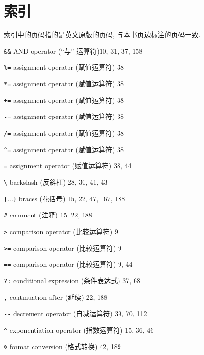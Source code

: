 \chapter{索引}
\label{chap:index}

索引中的页码指的是英文原版的页码, 与本书页边标注的页码一致.

\begin{multicols}{2}
\setlength\parindent{0pt}
\small
\hangindent=2pc  \verb'&&' AND operator (``与'' 运算符)10, 31, 37, 158

\hangindent=2pc  \verb'%=' assignment operator (赋值运算符) 38

\hangindent=2pc  \verb'*=' assignment operator (赋值运算符) 38

\hangindent=2pc  \verb'+=' assignment operator (赋值运算符) 38

\hangindent=2pc  \verb'-=' assignment operator (赋值运算符) 38

\hangindent=2pc  \verb'/=' assignment operator (赋值运算符) 38

\hangindent=2pc  \verb'^=' assignment operator (赋值运算符) 38

\hangindent=2pc  \verb'=' assignment operator (赋值运算符) 38, 44

\hangindent=2pc  \verb'\' backslash (反斜杠) 28, 30, 41, 43

\hangindent=2pc  \verb'{'...\verb'}' braces (花括号) 15, 22, 47, 167, 188

\hangindent=2pc  \verb'#' comment (注释) 15, 22, 188

\hangindent=2pc  \verb'>' comparison operator (比较运算符) 9

\hangindent=2pc  \verb'>=' comparison operator (比较运算符) 9

\hangindent=2pc  \verb'==' comparison operator (比较运算符) 9, 44

\hangindent=2pc  \verb'?:' conditional expression (条件表达式) 37, 68

\hangindent=2pc  \verb',' continuation after (延续) 22, 188

\hangindent=2pc  \verb'--' decrement operator (自减运算符) 39, 70, 112

\hangindent=2pc  \verb'^' exponentiation operator (指数运算符) 15, 36, 46

\hangindent=2pc  \verb'%' format conversion (格式转换) 42, 189


\end{multicols}
